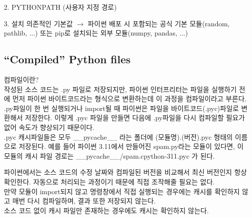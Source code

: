 2. PYTHONPATH (사용자 지정 경로)

3. 설치 의존적인 기본값
\(\rightarrow\) 파이썬 배포 시 포함되는 공식 기본 모듈(random, pathlib, ...) 또는 pip로 설치되는 외부 모듈(numpy, pandas, ...)


\subsection{“Compiled” Python files}
컴파일이란?\\
작성된 소스 코드는 .py 파일로 저장되지만, 파이썬 인터프리터는 파일을 실행하기 전에 먼저 파이썬 바이트코드라는 형식으로 변환하는데 이 과정을 컴파일이라고 부른다. \\
\newline
.py파일이 한 번 실행되거나 import될 때 파이썬은 파일을 바이트코드(.pyc)파일로 변환해서 저장한다. 이렇게 .pyc 파일을 만들면 다음에 .py파일을 다시 컴파일할 필요가 없어 속도가 향상되기 때문이다. \\
.pyc 캐시파일들은 모두 \_\_pycache\_\_ 라는 폴더에 (모듈명).(버전).pyc 형태의 이름으로 저장된다. 예를 들어 파이썬 3.11에서 만들어진 spam.py라는 모듈이 있다면,  이 모듈의 캐시 파일 경로는 \_\_pycache\_\_/spam.cpython-311.pyc 가 된다.

파이썬에서는 소스 코드의 수정 날짜와 컴파일된 버전을 비교해서 최신 버전인지 항상 확인한다. 자동으로 처리되는 과정이기 때문에 직접 조작해줄 필요는 없다.\\
\newline
만약 모듈이 import되지 않고 명령창에서 직접 실행되는 경우에는 캐시를 확인하지 않고 매번 다시 컴파일하며, 결과 또한 저장되지 않는다. \\소스 코드 없이 캐시 파일만 존재하는 경우에도 캐시는 확인하지 않는다.

